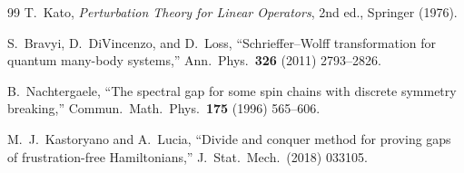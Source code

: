 \documentclass[12pt,a4paper]{article}
\begin{document}
\begin{thebibliography}{99}
 T.~Kato, \emph{Perturbation Theory for Linear Operators}, 2nd ed., Springer (1976).

 S.~Bravyi, D.~DiVincenzo, and D.~Loss, ``Schrieffer--Wolff transformation for quantum many-body systems,'' Ann.\ Phys.\ \textbf{326} (2011) 2793--2826.

 B.~Nachtergaele, ``The spectral gap for some spin chains with discrete symmetry breaking,'' Commun.\ Math.\ Phys.\ \textbf{175} (1996) 565--606.

 M.~J.~Kastoryano and A.~Lucia, ``Divide and conquer method for proving gaps of frustration-free Hamiltonians,'' J.~Stat.\ Mech.\ (2018) 033105.

\end{thebibliography}
\end{document}
